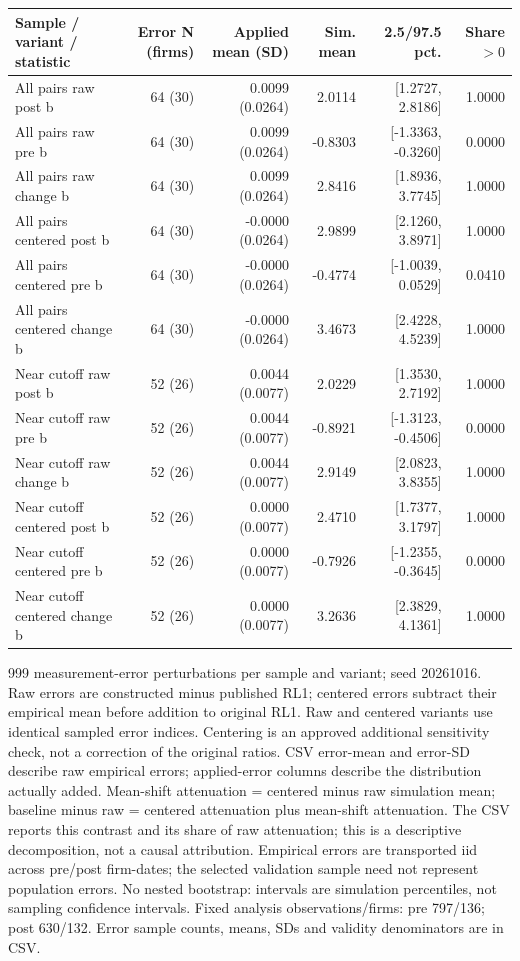 \begingroup\scriptsize\setlength{\tabcolsep}{3pt}
\begin{threeparttable}
\begin{tabular}{lrrrrr}
\toprule
Sample / variant / statistic & Error N (firms) & Applied mean (SD) & Sim. mean & 2.5/97.5 pct. & Share $>0$ \\
\midrule
All pairs raw post b & 64 (30) & 0.0099 (0.0264) & 2.0114 & [1.2727, 2.8186] & 1.0000 \\
All pairs raw pre b & 64 (30) & 0.0099 (0.0264) & -0.8303 & [-1.3363, -0.3260] & 0.0000 \\
All pairs raw change b & 64 (30) & 0.0099 (0.0264) & 2.8416 & [1.8936, 3.7745] & 1.0000 \\
All pairs centered post b & 64 (30) & -0.0000 (0.0264) & 2.9899 & [2.1260, 3.8971] & 1.0000 \\
All pairs centered pre b & 64 (30) & -0.0000 (0.0264) & -0.4774 & [-1.0039, 0.0529] & 0.0410 \\
All pairs centered change b & 64 (30) & -0.0000 (0.0264) & 3.4673 & [2.4228, 4.5239] & 1.0000 \\
Near cutoff raw post b & 52 (26) & 0.0044 (0.0077) & 2.0229 & [1.3530, 2.7192] & 1.0000 \\
Near cutoff raw pre b & 52 (26) & 0.0044 (0.0077) & -0.8921 & [-1.3123, -0.4506] & 0.0000 \\
Near cutoff raw change b & 52 (26) & 0.0044 (0.0077) & 2.9149 & [2.0823, 3.8355] & 1.0000 \\
Near cutoff centered post b & 52 (26) & 0.0000 (0.0077) & 2.4710 & [1.7377, 3.1797] & 1.0000 \\
Near cutoff centered pre b & 52 (26) & 0.0000 (0.0077) & -0.7926 & [-1.2355, -0.3645] & 0.0000 \\
Near cutoff centered change b & 52 (26) & 0.0000 (0.0077) & 3.2636 & [2.3829, 4.1361] & 1.0000 \\
\bottomrule
\end{tabular}
\begin{tablenotes}[flushleft]\footnotesize
\item[] 999 measurement-error perturbations per sample and variant; seed 20261016. Raw errors are constructed minus published RL1; centered errors subtract their empirical mean before addition to original RL1. Raw and centered variants use identical sampled error indices. Centering is an approved additional sensitivity check, not a correction of the original ratios. CSV error-mean and error-SD describe raw empirical errors; applied-error columns describe the distribution actually added. Mean-shift attenuation = centered minus raw simulation mean; baseline minus raw = centered attenuation plus mean-shift attenuation. The CSV reports this contrast and its share of raw attenuation; this is a descriptive decomposition, not a causal attribution. Empirical errors are transported iid across pre/post firm-dates; the selected validation sample need not represent population errors. No nested bootstrap: intervals are simulation percentiles, not sampling confidence intervals. Fixed analysis observations/firms: pre 797/136; post 630/132. Error sample counts, means, SDs and validity denominators are in CSV.
\end{tablenotes}
\end{threeparttable}
\endgroup
\par\medskip

